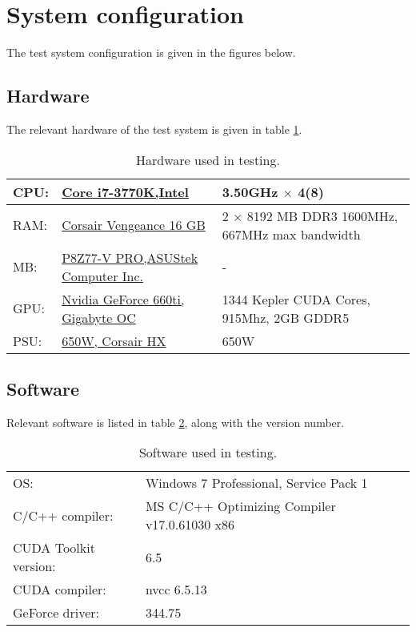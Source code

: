 
\section{System configuration}
The test system configuration is given in the figures below. 
\subsection{Hardware}
The relevant hardware of the test system is given in table \ref{tab:hardware}.
\begin{table}[h!]
\begin{sloppypar}
	\begin{tabular}{|| p{1cm} | p{5cm} | p{5cm} ||}
	\hline
		CPU:&		\href{http://ark.intel.com/products/65523}{Core i7-3770K,\newline Intel} &
			3.50GHz $\times$ 4(8) \\ \hline
		RAM:&	\href{http://www.corsair.com/en/vengeancer-16gb-dual-channel-ddr3-memory-kit-cmz16gx3m2a1600c9g}{Corsair Vengeance 16 GB}\cite{} &
			2 $\times$ 8192 MB DDR3 1600MHz, 667MHz max bandwidth\\ \hline
		MB:&		\href{http://www.asus.com/Motherboards/P8Z77V_PRO/}{P8Z77-V PRO,\newline ASUStek Computer Inc.} &
			-\\ \hline
		GPU:&		\href{http://www.gigabyte.com/products/product-page.aspx?pid=4319\#ov}{Nvidia GeForce 660ti, Gigabyte OC} &
			1344 Kepler CUDA Cores, 915Mhz, 2GB GDDR5\\ \hline
		PSU:&		\href{http://www.corsair.com/en/hx-series-hx650-power-supply-650-watt-80-plus-gold-certified-modular-psu}{650W, Corsair HX} &
			650W\\
	\hline
	\end{tabular}
\end{sloppypar}
\caption{Hardware used in testing.}
\label{tab:hardware}
\end{table}

\subsection{Software}
Relevant software is listed in table \ref{tab:software}, along with the version number.
\begin{table}[h!]
\begin{sloppypar}
	\begin{tabular}{|| p{3.5cm} | p{8cm} ||}
	\hline
		OS:& Windows 7 Professional, Service Pack 1\\
		C/C++ compiler:& MS C/C++ Optimizing Compiler v17.0.61030 x86\\
		CUDA Toolkit version:& 6.5\\
		CUDA compiler:& nvcc 6.5.13\\
		GeForce driver:& 344.75\\
	\hline
	\end{tabular}
\end{sloppypar}
\caption{Software used in testing.}
\label{tab:software}
\end{table}

